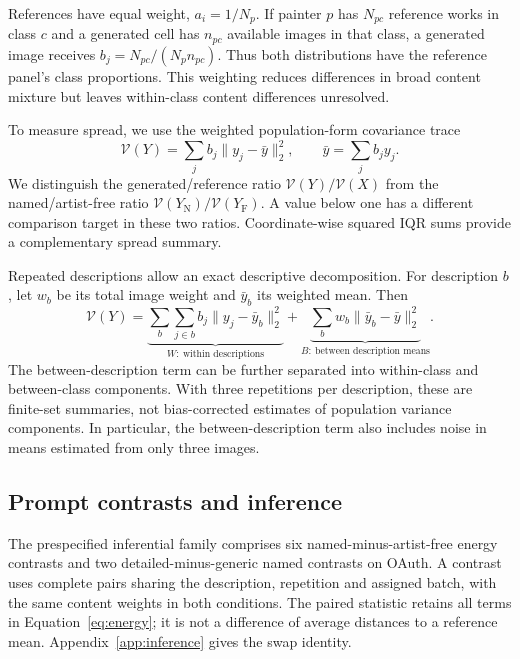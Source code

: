 \documentclass[11pt]{article}
\newcommand{\V}{\mathcal V}
\begin{document}
References have equal weight, $a_i=1/N_p$. If painter $p$ has $N_{pc}$ reference
works in class $c$ and a generated cell has $n_{pc}$ available images in that
class, a generated image receives $b_j=N_{pc}/(N_p n_{pc})$. Thus both distributions
have the reference panel's class proportions. This weighting reduces differences
in broad content mixture but leaves within-class content differences unresolved.

To measure spread, we use the weighted population-form covariance trace
\begin{equation}
\V(Y)=\sum_j b_j\|y_j-\bar y\|_2^2,
\qquad \bar y=\sum_j b_jy_j.
\label{eq:trace}
\end{equation}
We distinguish the generated/reference ratio $\V(Y)/\V(X)$ from the
named/artist-free ratio $\V(Y_{\mathrm N})/\V(Y_{\mathrm F})$.
A value below one has a different comparison target in these two ratios.
Coordinate-wise squared IQR sums provide a complementary spread summary.

Repeated descriptions allow an exact descriptive decomposition. For description
$b$, let $w_b$ be its total image weight and $\bar y_b$ its weighted mean. Then
\begin{equation}
\V(Y)=
\underbrace{\sum_b\sum_{j\in b}b_j\|y_j-\bar y_b\|_2^2}_{W:\ \text{within descriptions}}
+\underbrace{\sum_b w_b\|\bar y_b-\bar y\|_2^2}_{B:\ \text{between description means}}.
\label{eq:decomposition}
\end{equation}
The between-description term can be further separated into within-class and
between-class components. With three repetitions per description, these are
finite-set summaries, not bias-corrected estimates of population variance
components.
In particular, the between-description term also includes noise in means
estimated from only three images.

\subsection{Prompt contrasts and inference}
The prespecified inferential family comprises six named-minus-artist-free
energy contrasts and two detailed-minus-generic named contrasts on OAuth. A
contrast uses complete pairs sharing the description, repetition and assigned
batch, with the same content weights in both conditions. The paired statistic
retains all terms in Equation~\ref{eq:energy}; it is not a difference of average
distances to a reference mean. Appendix~\ref{app:inference} gives the swap identity.
\end{document}
